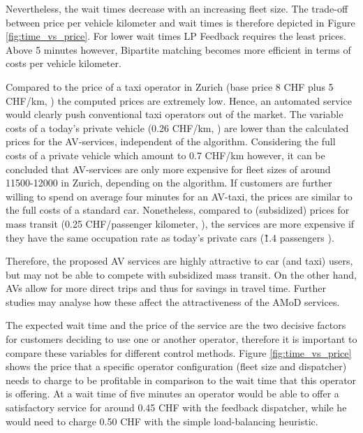 Nevertheless, the wait times decrease with an increasing fleet size. The trade-off between price per vehicle kilometer and wait times is therefore depicted in Figure \ref{fig:time_vs_price}. For lower wait times LP Feedback requires the least prices. Above 5 minutes however, Bipartite matching becomes more efficient in terms of costs per vehicle kilometer.


Compared to the price of a taxi operator in Zurich (base price 8 CHF plus 5 CHF/km, \cite{StadtZurich2014})
the computed prices are extremely low. Hence, an automated service would clearly
push conventional taxi operators out of the market. The variable costs of a today's
private vehicle (0.26 CHF/km, \cite{TCS2016}) are lower than the calculated prices for the AV-services,
independent of the algorithm. Considering the full costs of a private vehicle which amount to 0.7 CHF/km \cite{TCS2016} however, it can be concluded that AV-services are only more expensive for fleet sizes of around 11500-12000
in Zurich, depending on the algorithm. If customers are further willing to spend on average four minutes
for an AV-taxi, the prices are similar to the full costs of a standard car.
Nonetheless, compared to (subsidized) prices for mass transit (0.25 CHF/passenger kilometer, \cite{Bosch2016a}), the services are more expensive if they have the same occupation rate as today's private cars (\~1.4 passengers \cite{Bosch2016a}).

Therefore, the proposed AV services are highly attractive to car (and taxi) users, but may
not be able to compete with subsidized mass transit. On the other hand, AVs
allow for more direct trips and thus for savings in travel time. Further studies
may analyse how these affect the attractiveness of the AMoD services.

The expected wait time and the price of the service are the two decisive factors
for customers deciding to use one or another operator, therefore it is important
to compare these variables for different control methods. Figure \ref{fig:time_vs_price}
shows the price that a specific operator configuration (fleet size and dispatcher)
needs to charge to be profitable in comparison to the wait time that this operator is offering.
At a wait time of five minutes an operator would be able to offer a satisfactory service for
around 0.45 CHF with the feedback dispatcher, while he would need to charge 0.50 CHF
with the simple load-balancing heuristic.

